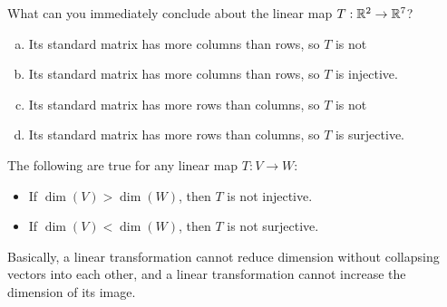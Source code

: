 \begin{applicationActivities}
\begin{activity}{2}
  What can you immediately conclude about the linear map \(T:\IR^2\to\IR^7\)?
  \begin{enumerate}[a)]
    \item Its standard matrix has more columns than rows, so \(T\) is not
    \item Its standard matrix has more columns than rows, so \(T\) is
    injective.
    \item Its standard matrix has more rows than columns, so \(T\) is not
    \item Its standard matrix has more rows than columns, so \(T\) is
    surjective.
  \end{enumerate}
\end{activity}

\begin{fact}
  The following are true for any linear map \(T:V\to W\):
  \begin{itemize}
    \item If \(\dim(V)>\dim(W)\), then \(T\) is not injective.
    \item If \(\dim(V)<\dim(W)\), then \(T\) is not surjective.
  \end{itemize}
  Basically, a linear transformation cannot reduce dimension without collapsing
  vectors into each other, and a linear transformation cannot
  increase the dimension of its image.
  \begin{center}
    \hspace{3em}
    \begin{tikzpicture}[x=0.12in,y=0.12in]

\end{tikzpicture}
\end{center}
\end{fact}
\end{applicationActivities}
